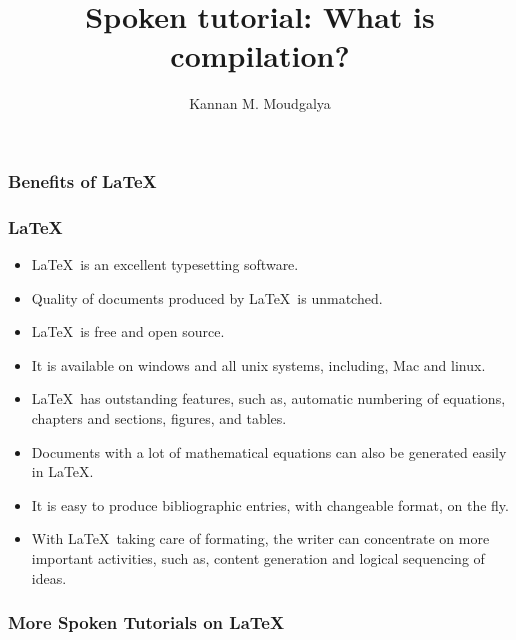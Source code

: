 \documentclass[blue]{beamer}
\begin{document}
\title[\hspace{1cm}Spoken tutorial: What is compilation?
\hspace{0.5cm}\insertframenumber/\inserttotalframenumber]
{Spoken tutorial: What is compilation?}
\author[Kannan Moudgalya] {Kannan M. Moudgalya}
\begin{frame}
\frametitle{Benefits of \LaTeX}
\end{frame}



\begin{frame}
\frametitle{\LaTeX}
\begin{itemize}
\item<+-|alert@+> \LaTeX\ is an excellent typesetting software.
\item<+-|alert@+> Quality of documents produced by \LaTeX\ is unmatched.
\item<+-|alert@+> \LaTeX\ is free and open source.
\item<+-|alert@+> It is available on windows and all unix systems, including, Mac and linux.
\item<+-|alert@+> \LaTeX\ has outstanding features, such as, automatic numbering of equations, chapters and sections, figures, and tables.
\item<+-|alert@+> Documents with a lot of mathematical equations
  can also be generated easily in \LaTeX.
\item<+-|alert@+> It is easy to produce bibliographic entries,
  with changeable format, on the fly.
\item<+-|alert@+> With \LaTeX\ taking care of formating, the writer can concentrate on more important activities, such as, content generation and logical sequencing of ideas.
\end{itemize}
\end{frame}

\begin{frame}
\frametitle{More Spoken Tutorials on \LaTeX}
\end{frame}
\end{document}
